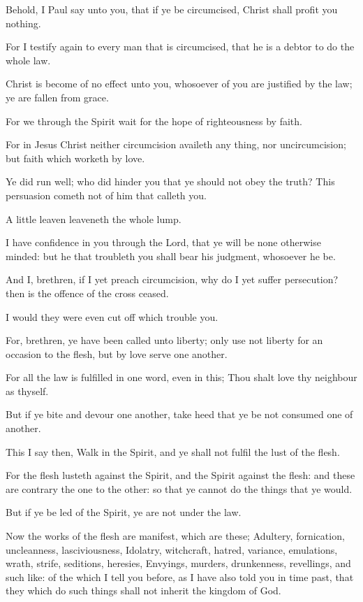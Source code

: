 \Verse Behold, I Paul say unto you, that if ye be circumcised, Christ shall profit you nothing.

\Verse For I testify again to every man that is circumcised, that he is a debtor to do the whole law.

\Verse Christ is become of no effect unto you, whosoever of you are justified by the law; ye are fallen from grace.

\Verse For we through the Spirit wait for the hope of righteousness by faith.

\Verse For in Jesus Christ neither circumcision availeth any thing, nor uncircumcision; but faith which worketh by love.

\Verse Ye did run well; who did hinder you that ye should not obey the truth?  \Verse This persuasion cometh not of him that calleth you.

\Verse A little leaven leaveneth the whole lump.

\Verse I have confidence in you through the Lord, that ye will be none otherwise minded: but he that troubleth you shall bear his judgment, whosoever he be.

\Verse And I, brethren, if I yet preach circumcision, why do I yet suffer persecution? then is the offence of the cross ceased.

\Verse I would they were even cut off which trouble you.

\Verse For, brethren, ye have been called unto liberty; only use not liberty for an occasion to the flesh, but by love serve one another.

\Verse For all the law is fulfilled in one word, even in this; Thou shalt love thy neighbour as thyself.

\Verse But if ye bite and devour one another, take heed that ye be not consumed one of another.

\Verse This I say then, Walk in the Spirit, and ye shall not fulfil the lust of the flesh.

\Verse For the flesh lusteth against the Spirit, and the Spirit against the flesh: and these are contrary the one to the other: so that ye cannot do the things that ye would.

\Verse But if ye be led of the Spirit, ye are not under the law.

\Verse Now the works of the flesh are manifest, which are these; Adultery, fornication, uncleanness, lasciviousness, \Verse Idolatry, witchcraft, hatred, variance, emulations, wrath, strife, seditions, heresies, \Verse Envyings, murders, drunkenness, revellings, and such like: of the which I tell you before, as I have also told you in time past, that they which do such things shall not inherit the kingdom of God.

